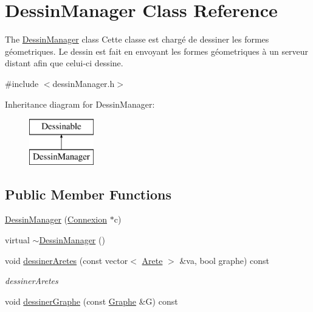 \hypertarget{class_dessin_manager}{\section{Dessin\+Manager Class Reference}
\label{class_dessin_manager}
}


The \hyperlink{class_dessin_manager}{Dessin\+Manager} class Cette classe est chargé de dessiner les formes géometriques. Le dessin est fait en envoyant les formes géometriques à un serveur distant afin que celui-\/ci dessine.  




{\ttfamily \#include $<$dessin\+Manager.\+h$>$}

Inheritance diagram for Dessin\+Manager\+:\begin{figure}[H]
\begin{center}
\leavevmode
\includegraphics[height=2.000000cm]{class_dessin_manager}
\end{center}
\end{figure}
\subsection*{Public Member Functions}
\begin{DoxyCompactItemize}
\item 
\hyperlink{class_dessin_manager_ac3fc2fa6c1ac46893076b6b4529b8511}{Dessin\+Manager} (\hyperlink{class_connexion}{Connexion} $\ast$c)
\item 
virtual \hyperlink{class_dessin_manager_a1c10f7ad9be134e881db795c638883c5}{$\sim$\+Dessin\+Manager} ()
\item 
void \hyperlink{class_dessin_manager_a1ff8d659f99a5e799f5d6e19c8be97dc}{dessiner\+Aretes} (const vector$<$ \hyperlink{class_arete}{Arete} $>$ \&va, bool graphe) const 
\begin{DoxyCompactList}\small\item\em dessiner\+Aretes \end{DoxyCompactList}\item 
void \hyperlink{class_dessin_manager_a5f7b7feccd2c18af1d852c6ce78456c5}{dessiner\+Graphe} (const \hyperlink{class_graphe}{Graphe} \&G) const 
\end{DoxyCompactItemize}


